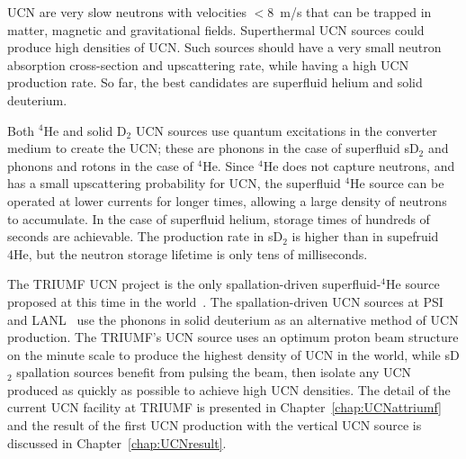 UCN are very slow neutrons with velocities $<8$~m/s that can be
trapped in matter, magnetic and gravitational fields.  Superthermal
UCN sources could produce high densities of UCN. Such sources should
have a very small neutron absorption cross-section and upscattering
rate, while having a high UCN production rate. So far, the best
candidates are superfluid helium and solid deuterium.

Both $^4$He and solid D$_2$ UCN sources use quantum excitations in the
converter medium to create the UCN; these are phonons in the case of
superfluid sD$_2$ and phonons and rotons in the case of $^4$He. Since
$^4$He does not capture neutrons, and has a small upscattering
probability for UCN, the superfluid $^4$He source can be operated at
lower currents for longer times, allowing a large density of neutrons
to accumulate. In the case of superfluid helium, storage times of
hundreds of seconds are achievable. The production rate in sD$_2$ is
higher than in supefruid 4He, but the neutron storage lifetime is only
tens of milliseconds.

The TRIUMF UCN project is the only spallation-driven superfluid-$^4$He
source proposed at this time in the world~\cite{Ruediger}. The
spallation-driven UCN sources at PSI~\cite{Ries_ascona} and
LANL~\cite{Ito_ascona} use the phonons in solid deuterium as an
alternative method of UCN production.
The TRIUMF's UCN source uses an optimum proton beam structure on the
minute scale to produce the highest density of UCN in the world, while
sD$_2$ spallation sources benefit from pulsing the beam, then isolate
any UCN produced as quickly as possible to achieve high UCN densities.
The detail of the current UCN facility at TRIUMF is presented in
Chapter~\ref{chap:UCNattriumf} and the result of the first UCN
production with the vertical UCN source is discussed in
Chapter~\ref{chap:UCNresult}.

